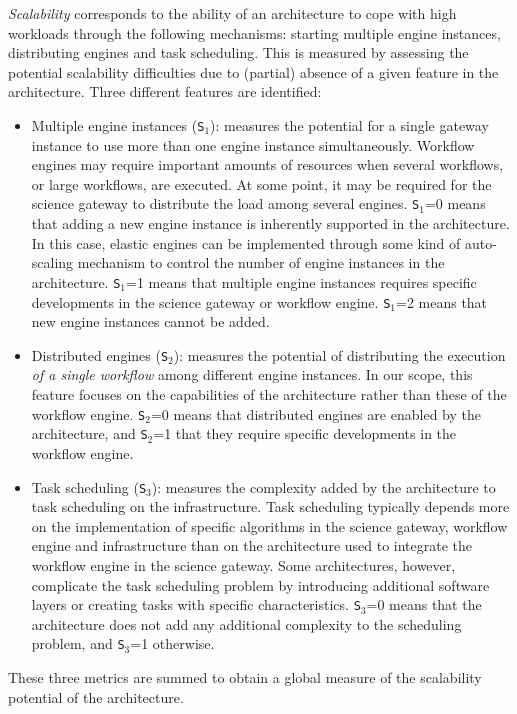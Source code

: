 \documentclass[preprint,3p,twocolumn]{elsarticle}
\begin{document}
\emph{Scalability} corresponds to the ability of an architecture to
cope with high workloads through the following mechanisms: starting multiple engine instances, distributing engines and task scheduling. 
This is measured by assessing the potential
scalability difficulties due to (partial) absence of a given feature in the architecture.  
 Three different features are identified:
\begin{itemize}[leftmargin=0cm,itemindent=0.35cm,itemsep=0cm]
\item Multiple engine instances (\texttt{S$_1$}): measures the
  potential for a single gateway instance to use more than one engine
  instance simultaneously. Workflow engines may require important
  amounts of resources when several workflows, or large workflows, are
  executed. At some point, it may be required for the science gateway
  to distribute the load among several engines. \texttt{S$_1$}=0 means
  that
  adding a new engine instance is inherently supported in the
  architecture. In this case, elastic engines can be implemented
  through some kind of auto-scaling mechanism to control the number of
  engine instances in the architecture. \texttt{S$_1$}=1 means that
  multiple engine instances requires specific developments in the
  science gateway or workflow engine. \texttt{S$_1$}=2 means that new
  engine instances cannot be added.
\item Distributed engines (\texttt{S$_2$}): measures the potential of distributing
  the execution \emph{of a single workflow} among different engine
  instances. In our scope, this feature focuses on the capabilities of
  the architecture rather than these of the workflow
  engine. \texttt{S$_2$}=0 means that distributed engines are enabled by
  the architecture, and \texttt{S$_2$}=1 that they require specific
  developments in the workflow engine. 
\item Task scheduling (\texttt{S$_3$}): measures the complexity
  added by the architecture to task scheduling on
  the infrastructure. Task
  scheduling typically depends more on the implementation of specific
  algorithms in the science gateway, workflow engine and
  infrastructure than on the architecture used to integrate the
  workflow engine in the science gateway. Some architectures, however,
  complicate the task scheduling problem by introducing additional
  software layers or creating tasks with specific
  characteristics. \texttt{S$_3$}=0 means that the architecture does
  not add any additional complexity to the scheduling problem,
  and \texttt{S$_3$}=1 otherwise.
\end{itemize}
These three metrics are summed to obtain a global measure of the scalability
potential of the architecture.
\end{document}
